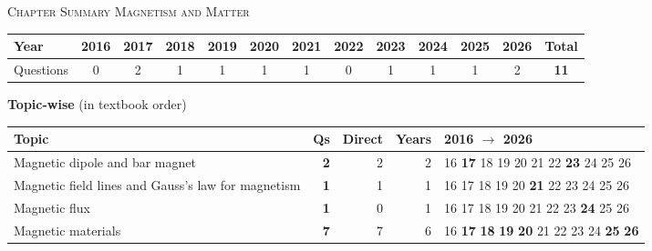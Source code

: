 \par{}\vspace{14pt}
\begin{center}{}\par
{\large\color{navy}\scshape Chapter Summary \textperiodcentered{} Magnetism and Matter}\end{center}
{\small\setlength{\tabcolsep}{3.5pt}
\begin{tabular*}{\linewidth}{@{\extracolsep{\fill}}l*{11}{c}c@{}}\toprule
Year & 2016 & 2017 & 2018 & 2019 & 2020 & 2021 & 2022 & 2023 & 2024 & 2025 & 2026 & Total\\\midrule
Questions & 0 & 2 & 1 & 1 & 1 & 1 & 0 & 1 & 1 & 1 & 2 & \textbf{11}\\\bottomrule\end{tabular*}}\par\medskip
{\small\textbf{\color{crimson}Topic-wise} (in textbook order)\par\smallskip
\begin{tabularx}{\linewidth}{@{}>{\raggedright\arraybackslash}Xrrrl@{}}\toprule
Topic & Qs & Direct & Years & 2016 $\rightarrow$ 2026\\\midrule
Magnetic dipole and bar magnet & \textbf{2} & 2 & 2 & {\scriptsize {\color{gray!45}16} \textbf{17} {\color{gray!45}18} {\color{gray!45}19} {\color{gray!45}20} {\color{gray!45}21} {\color{gray!45}22} \textbf{23} {\color{gray!45}24} {\color{gray!45}25} {\color{gray!45}26}}\\
Magnetic field lines and Gauss's law for magnetism & \textbf{1} & 1 & 1 & {\scriptsize {\color{gray!45}16} {\color{gray!45}17} {\color{gray!45}18} {\color{gray!45}19} {\color{gray!45}20} \textbf{21} {\color{gray!45}22} {\color{gray!45}23} {\color{gray!45}24} {\color{gray!45}25} {\color{gray!45}26}}\\
Magnetic flux & \textbf{1} & 0 & 1 & {\scriptsize {\color{gray!45}16} {\color{gray!45}17} {\color{gray!45}18} {\color{gray!45}19} {\color{gray!45}20} {\color{gray!45}21} {\color{gray!45}22} {\color{gray!45}23} \textbf{24} {\color{gray!45}25} {\color{gray!45}26}}\\
Magnetic materials & \textbf{7} & 7 & 6 & {\scriptsize {\color{gray!45}16} \textbf{17} \textbf{18} \textbf{19} \textbf{20} {\color{gray!45}21} {\color{gray!45}22} {\color{gray!45}23} {\color{gray!45}24} \textbf{25} \textbf{26}}\\
\bottomrule\end{tabularx}}\par\medskip

